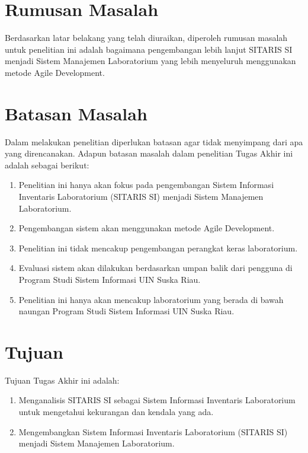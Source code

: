 \section{Rumusan Masalah}
Berdasarkan latar belakang yang telah diuraikan, diperoleh rumusan masalah untuk penelitian ini adalah bagaimana pengembangan lebih lanjut SITARIS SI menjadi Sistem Manajemen Laboratorium yang lebih menyeluruh menggunakan metode Agile Development.

\section{Batasan Masalah}
Dalam melakukan penelitian diperlukan batasan agar tidak menyimpang dari apa yang direncanakan. Adapun batasan masalah dalam penelitian Tugas Akhir ini adalah sebagai berikut:
\begin{enumerate}
	\item Penelitian ini hanya akan fokus pada pengembangan Sistem Informasi Inventaris Laboratorium (SITARIS SI) menjadi Sistem Manajemen Laboratorium.
	\item Pengembangan sistem akan menggunakan metode Agile Development.
	\item Penelitian ini tidak mencakup pengembangan perangkat keras laboratorium.
	\item Evaluasi sistem akan dilakukan berdasarkan umpan balik dari pengguna di Program Studi Sistem Informasi UIN Suska Riau.
	\item Penelitian ini hanya akan mencakup laboratorium yang berada di bawah naungan Program Studi Sistem Informasi UIN Suska Riau.
\end{enumerate}

\section{Tujuan}
Tujuan Tugas Akhir ini adalah:
\begin{enumerate}
	\item Menganalisis SITARIS SI sebagai Sistem Informasi Inventaris Laboratorium untuk mengetahui kekurangan dan kendala yang ada.
	\item Mengembangkan Sistem Informasi Inventaris Laboratorium (SITARIS SI) menjadi Sistem Manajemen Laboratorium.
\end{enumerate}

